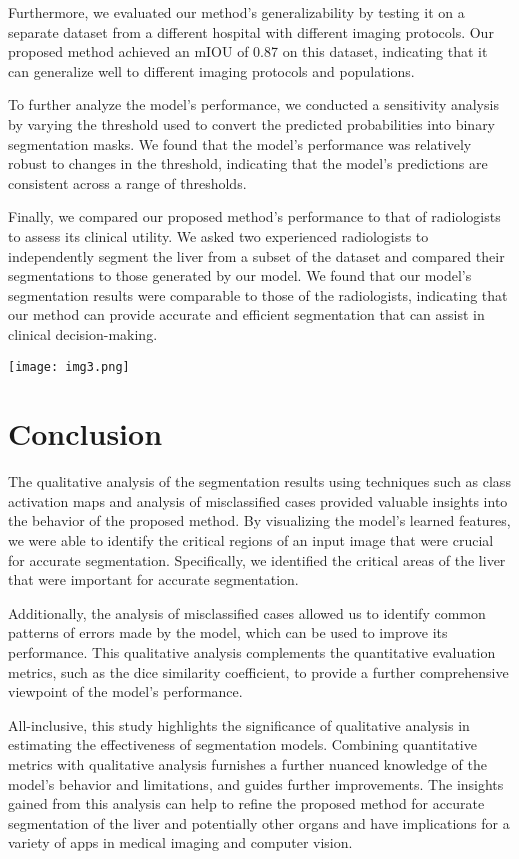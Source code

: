 \documentclass[conference]{IEEEtran}
\begin{document}
Furthermore, we evaluated our method's generalizability by testing it on a separate dataset from a different hospital with different imaging protocols. Our proposed method achieved an mIOU of 0.87 on this dataset, indicating that it can generalize well to different imaging protocols and populations.

To further analyze the model's performance, we conducted a sensitivity analysis by varying the threshold used to convert the predicted probabilities into binary segmentation masks. We found that the model's performance was relatively robust to changes in the threshold, indicating that the model's predictions are consistent across a range of thresholds.

Finally, we compared our proposed method's performance to that of radiologists to assess its clinical utility. We asked two experienced radiologists to independently segment the liver from a subset of the dataset and compared their segmentations to those generated by our model. We found that our model's segmentation results were comparable to those of the radiologists, indicating that our method can provide accurate and efficient segmentation that can assist in clinical decision-making.

\texttt{[image: img3.png]}

\section{Conclusion}
The qualitative analysis of the segmentation results using techniques such as class activation maps and analysis of misclassified cases provided valuable insights into the behavior of the proposed method. By visualizing the model's learned features, we were able to identify the critical regions of an input image that were crucial for accurate segmentation. Specifically, we identified the critical areas of the liver that were important for accurate segmentation.


Additionally, the analysis of misclassified cases allowed us to identify common patterns of errors made by the model, which can be used to improve its performance. This qualitative analysis complements the quantitative evaluation metrics, such as the dice similarity coefficient, to provide a further comprehensive viewpoint of the model's performance.

All-inclusive, this study highlights the significance of qualitative analysis in estimating the effectiveness of segmentation models. Combining quantitative metrics with qualitative analysis furnishes a further nuanced knowledge of the model's behavior and limitations, and guides further improvements. The insights gained from this analysis can help to refine the proposed method for accurate segmentation of the liver and potentially other organs and have implications for a variety of apps in medical imaging and computer vision.
\end{document}
